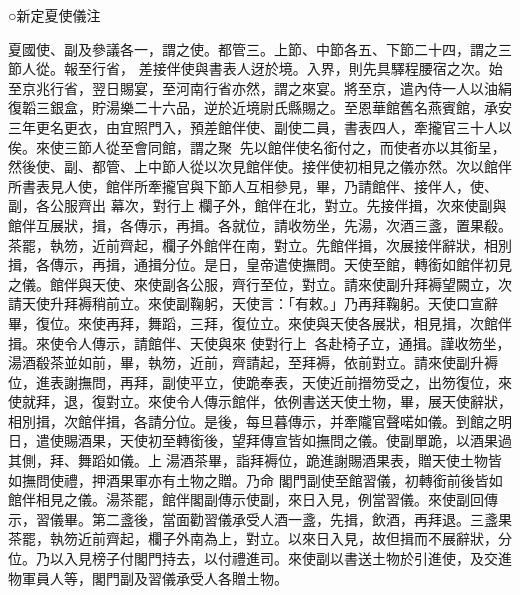 \begin{pinyinscope}
 ○新定夏使儀注



 夏國使、副及參議各一，謂之使。都管三。上節、中節各五、下節二十四，謂之三節人從。報至行省，
 差接伴使與書表人迓於境。入界，則先具驛程腰宿之次。始至京兆行省，翌日賜宴，至河南行省亦然，謂之來宴。將至京，遣內侍一人以油絹復韜三銀盒，貯湯樂二十六品，逆於近境尉氏縣賜之。至恩華館舊名燕賓館，承安三年更名更衣，由宜照門入，預差館伴使、副使二員，書表四人，牽攏官三十人以俟。來使三節人從至會同館，謂之聚，先以館伴使名銜付之，而使者亦以其銜呈，然後使、副、都管、上中節人從以次見館伴使。接伴使初相見之儀亦然。次以館伴所書表見人使，館伴所牽攏官與下節人互相參見，畢，乃請館伴、接伴人，使、副，各公服齊出
 幕次，對行上欄子外，館伴在北，對立。先接伴揖，次來使副與館伴互展狀，揖，各傳示，再揖。各就位，請收笏坐，先湯，次酒三盞，置果殽。茶罷，執笏，近前齊起，欄子外館伴在南，對立。先館伴揖，次展接伴辭狀，相別揖，各傳示，再揖，通揖分位。是日，皇帝遣使撫問。天使至館，轉銜如館伴初見之儀。館伴與天使、來使副各公服，齊行至位，對立。請來使副升拜褥望闕立，次請天使升拜褥稍前立。來使副鞠躬，天使言：「有敕。」乃再拜鞠躬。天使口宣辭畢，復位。來使再拜，舞蹈，三拜，復位立。來使與天使各展狀，相見揖，次館伴揖。來使令人傳示，請館伴、天使與來
 使對行上，各赴椅子立，通揖。謹收笏坐，湯酒殽茶並如前，畢，執笏，近前，齊請起，至拜褥，依前對立。請來使副升褥位，進表謝撫問，再拜，副使平立，使跪奉表，天使近前搢笏受之，出笏復位，來使就拜，退，復對立。來使令人傳示館伴，依例書送天使土物，畢，展天使辭狀，相別揖，次館伴揖，各請分位。是後，每旦暮傳示，并牽隴官聲喏如儀。到館之明日，遣使賜酒果，天使初至轉銜後，望拜傳宣皆如撫問之儀。使副單跪，以酒果過其側，拜、舞蹈如儀。上湯酒茶畢，詣拜褥位，跪進謝賜酒果表，贈天使土物皆如撫問使禮，押酒果軍亦有土物之贈。乃命
 閣門副使至館習儀，初轉銜前後皆如館伴相見之儀。湯茶罷，館伴閣副傳示使副，來日入見，例當習儀。來使副回傳示，習儀畢。第二盞後，當面勸習儀承受人酒一盞，先揖，飲酒，再拜退。三盞果茶罷，執笏近前齊起，欄子外南為上，對立。以來日入見，故但揖而不展辭狀，分位。乃以入見榜子付閣門持去，以付禮進司。來使副以書送土物於引進使，及交進物軍員人等，閣門副及習儀承受人各贈土物。




\end{pinyinscope}
